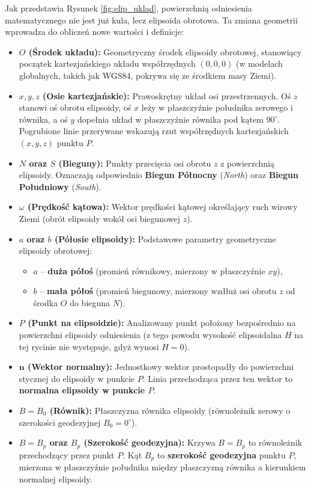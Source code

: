 Jak przedstawia Rysunek \ref{fig:elip_uklad}, powierzchnią odniesienia matematycznego nie jest już kula, lecz elipsoida obrotowa. Ta zmiana geometrii wprowadza do obliczeń nowe wartości i definicje:
\begin{itemize}
    \item \textbf{$O$ (Środek układu):} Geometryczny środek elipsoidy obrotowej, stanowiący początek kartezjańskiego układu współrzędnych $(0,0,0)$ (w modelach globalnych, takich jak WGS84, pokrywa się ze środkiem masy Ziemi).
    \item \textbf{$x, y, z$ (Osie kartezjańskie):} Prawoskrętny układ osi przestrzennych. Oś $z$ stanowi oś obrotu elipsoidy, oś $x$ leży w płaszczyźnie południka zerowego i równika, a oś $y$ dopełnia układ w płaszczyźnie równika pod kątem $90^\circ$. Pogrubione linie przerywane wskazują rzut współrzędnych kartezjańskich $(x, y, z)$ punktu $P$.
    \item \textbf{$N$ oraz $S$ (Bieguny):} Punkty przecięcia osi obrotu $z$ z powierzchnią elipsoidy. Oznaczają odpowiednio \textbf{Biegun Północny} (\textit{North}) oraz \textbf{Biegun Południowy} (\textit{South}).
    \item \textbf{$\omega$ (Prędkość kątowa):} Wektor prędkości kątowej określający ruch wirowy Ziemi (obrót elipsoidy wokół osi biegunowej $z$).
    \item \textbf{$a$ oraz $b$ (Półosie elipsoidy):} Podstawowe parametry geometryczne elipsoidy obrotowej:
    \begin{itemize}
        \item $a$ -- \textbf{duża półoś} (promień równikowy, mierzony w płaszczyźnie $xy$),
        \item $b$ -- \textbf{mała półoś} (promień biegunowy, mierzony wzdłuż osi obrotu $z$ od środka $O$ do bieguna $N$).
    \end{itemize}
    \item \textbf{$P$ (Punkt na elipsoidzie):} Analizowany punkt położony bezpośrednio na powierzchni elipsoidy odniesienia (z tego powodu wysokość elipsoidalna $H$ na tej rycinie nie występuje, gdyż wynosi $H=0$).
    \item \textbf{$\mathbf{n}$ (Wektor normalny):} Jednostkowy wektor prostopadły do powierzchni stycznej do elipsoidy w punkcie $P$. Linia przechodząca przez ten wektor to \textbf{normalna elipsoidy w punkcie $P$}.
    \item \textbf{$B = B_0$ (Równik):} Płaszczyzna równika elipsoidy (równoleżnik zerowy o szerokości geodezyjnej $B_0 = 0^\circ$).
    \item \textbf{$B = B_p$ oraz $B_p$ (Szerokość geodezyjna):} Krzywa $B=B_p$ to równoleżnik przechodzący przez punkt $P$. Kąt $B_p$ to \textbf{szerokość geodezyjna} punktu $P$, mierzona w płaszczyźnie południka między płaszczyzną równika a kierunkiem normalnej elipsoidy.

\end{itemize}
